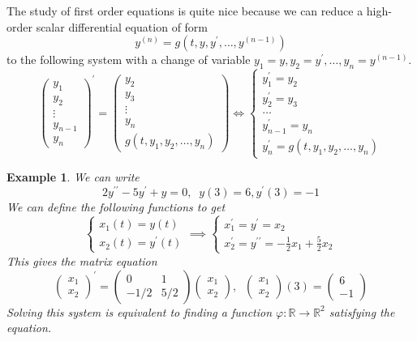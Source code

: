 \documentclass{article}
\newtheorem{example}{Example}[section]
\theoremstyle{remark}
\theoremstyle{definition}
\begin{document}
The study of first order equations is quite nice because we can reduce a high-order scalar differential equation of form
\[y^{(n)} = g(t, y, y^\prime, \ldots, y^{(n-1)})\]
to the following system with a change of variable $y_1 = y, y_2 = y^\prime, \ldots, y_n = y^{(n-1)}$. 
\[\begin{pmatrix}
y_1 \\ y_2 \\ \vdots \\ y_{n-1} \\ y_n
\end{pmatrix}^\prime = \begin{pmatrix}
y_2 \\ y_3 \\ \vdots \\ y_n \\ g(t, y_1, y_2, \ldots, y_n)
\end{pmatrix} \iff \begin{cases}
y_1^\prime = y_2 \\
y_2^\prime = y_3 \\
\ldots \\
y_{n-1}^\prime = y_n \\
y_n^\prime = g(t, y_1, y_2, \ldots, y_n)
\end{cases}\]

\begin{example}
We can write 
\[2 y^{\prime\prime} - 5 y^\prime + y = 0, \;\; y(3) = 6, y^\prime (3) = -1\]
We can define the following functions to get
\[\begin{cases}
    x_1 (t) = y(t) \\
    x_2 (t) = y^\prime (t) 
\end{cases} \implies \begin{cases}
x_1^\prime = y^\prime = x_2 \\
x_2^\prime = y^{\prime\prime} = -\frac{1}{2} x_1 + \frac{5}{2} x_2
\end{cases} \]
This gives the matrix equation
\[\begin{pmatrix}
x_1 \\ x_2
\end{pmatrix}^\prime = \begin{pmatrix}
0 & 1 \\ -1/2 & 5/2
\end{pmatrix} \begin{pmatrix}
x_1 \\ x_2
\end{pmatrix}, \;\; \begin{pmatrix} x_1 \\ x_2 \end{pmatrix} (3) = \begin{pmatrix} 6 \\ -1 \end{pmatrix}\]
Solving this system is equivalent to finding a function $\varphi: \mathbb{R} \longrightarrow \mathbb{R}^2$ satisfying the equation. 
\end{example}  
\end{document}
